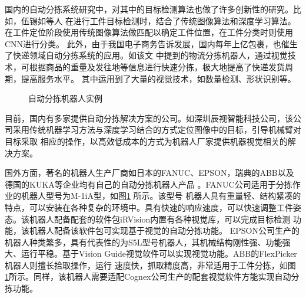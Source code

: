 国内的自动分拣系统研究中，对其中的目标检测算法也做了许多创新性的研究。比如，伍锡如等人  \cite{WXR2016}
在进行工件目标检测时，结合了传统图像算法和深度学习算法。在工件定位阶段使用传统图像算法做匹配以确定工件位置，在工件分类时则使用CNN进行分类。
此外，由于我国电子商务告诉发展，国内每年上亿包裹，也催生了快递领域自动分拣系统的应用。如该文    \cite{kuaidi}
中提到的物流分拣机器人，通过视觉技术，可根据商品的重量及发往地等信息进行快速分拣，极大地提高了快递发货周期，提高服务水平。
其中运用到了大量的视觉技术，如数量检测、形状识别等。
\begin{figure}[t]
    \centering
    \caption{自动分拣机器人实例}
    \label{fig:robot_example}
\end{figure}

目前，国内有多家提供自动分拣解决方案的公司。如深圳辰视智能科技公司，该公司采用传统机器学习方法与深度学习结合的方式定位图像中的目标，引导机械臂对目标采取
相应的操作，以高效低成本的方式为机器人厂家提供机器视觉相关的解决方案。

国外方面，著名的机器人生产厂商如日本的FANUC、EPSON，瑞典的ABB以及德国的KUKA等企业均有自己的自动分拣机器人产品   \cite{HZQ:2016}
。FANUC公司适用于分拣作业的机器人型号为M-1iA型，如图\ref{fig:robot_example}
所示。该型号
机器人具有重量轻、结构紧凑的特点，可以安装在各种复杂的环境中。具有快速的响应速度，可以快速调整工件姿态。该机器人配备配套的软件包iRVision内置有各种视觉库，可以完成目标检测
功能，该机器人配备该软件包可实现基于视觉的自动分拣功能。
EPSON公司生产的机器人种类繁多，具有代表性的为S5L型号机器人，其机械结构刚性强、功能强大、运行平稳。基于Vision Guide视觉软件可以实现视觉功能。ABB的FlexPicker机器人则擅长拾取操作，运行
速度快，抓取精度高，非常适用于工件分拣，如图
\ref{fig:robot_example}所示。同样，该机器人需要适配Cognex公司生产的配套视觉软件方能实现自动分拣功能。



